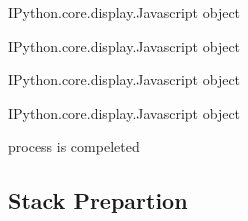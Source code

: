 \documentclass[letterpaper,10pt]{sphinxmanual}
\begin{document}
\begin{sphinxVerbatim}[commandchars=\\\{\}]
\PYGZlt{}IPython.core.display.Javascript object\PYGZgt{}
\end{sphinxVerbatim}



\begin{sphinxVerbatim}[commandchars=\\\{\}]
\PYGZlt{}IPython.core.display.Javascript object\PYGZgt{}
\end{sphinxVerbatim}



\begin{sphinxVerbatim}[commandchars=\\\{\}]
\PYGZlt{}IPython.core.display.Javascript object\PYGZgt{}
\end{sphinxVerbatim}



\begin{sphinxVerbatim}[commandchars=\\\{\}]
\PYGZlt{}IPython.core.display.Javascript object\PYGZgt{}
\end{sphinxVerbatim}



\begin{sphinxVerbatim}[commandchars=\\\{\}]
 process is compeleted
\end{sphinxVerbatim}

\begin{sphinxVerbatim}[commandchars=\\\{\}]

\end{sphinxVerbatim}

\sphinxstepscope


\subsection{Stack Prepartion}
\label{\detokenize{notebooks/Stack Prepartion:Stack-Prepartion}}\label{\detokenize{notebooks/Stack Prepartion::doc}}
\sphinxAtStartPar
{}
\end{document}
